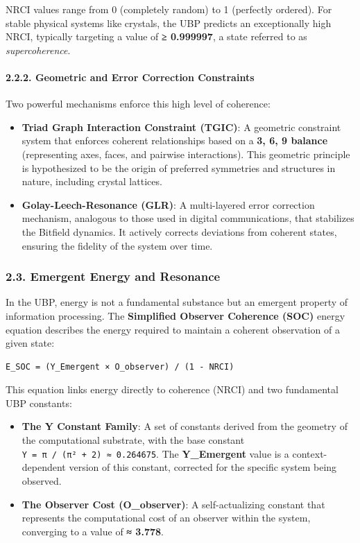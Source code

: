 NRCI values range from 0 (completely random) to 1 (perfectly ordered).
For stable physical systems like crystals, the UBP predicts an
exceptionally high NRCI, typically targeting a value of \textbf{≥
0.999997}, a state referred to as \emph{supercoherence}.

\paragraph{2.2.2. Geometric and Error Correction
Constraints}\label{geometric-and-error-correction-constraints}

Two powerful mechanisms enforce this high level of coherence:

\begin{itemize}
\tightlist
\item
  \textbf{Triad Graph Interaction Constraint (TGIC)}: A geometric
  constraint system that enforces coherent relationships based on a
  \textbf{3, 6, 9 balance} (representing axes, faces, and pairwise
  interactions). This geometric principle is hypothesized to be the
  origin of preferred symmetries and structures in nature, including
  crystal lattices.
\item
  \textbf{Golay-Leech-Resonance (GLR)}: A multi-layered error correction
  mechanism, analogous to those used in digital communications, that
  stabilizes the Bitfield dynamics. It actively corrects deviations from
  coherent states, ensuring the fidelity of the system over time.
\end{itemize}

\subsubsection{2.3. Emergent Energy and
Resonance}\label{emergent-energy-and-resonance}

In the UBP, energy is not a fundamental substance but an emergent
property of information processing. The \textbf{Simplified Observer
Coherence (SOC)} energy equation describes the energy required to
maintain a coherent observation of a given state:

\begin{verbatim}
E_SOC = (Y_Emergent × O_observer) / (1 - NRCI)
\end{verbatim}

This equation links energy directly to coherence (NRCI) and two
fundamental UBP constants:

\begin{itemize}
\tightlist
\item
  \textbf{The Y Constant Family}: A set of constants derived from the
  geometry of the computational substrate, with the base constant
  \texttt{Y\ =\ π\ /\ (π²\ +\ 2)\ ≈\ 0.264675}. The \textbf{Y\_Emergent}
  value is a context-dependent version of this constant, corrected for
  the specific system being observed.
\item
  \textbf{The Observer Cost (O\_observer)}: A self-actualizing constant
  that represents the computational cost of an observer within the
  system, converging to a value of \textbf{≈ 3.778}.
\end{itemize}

